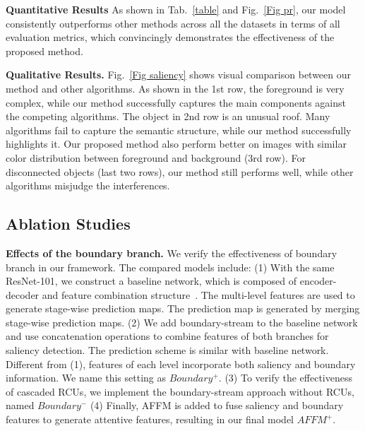 \documentclass[journal]{IEEEtran}
\begin{document}
\textbf{Quantitative Results}
As shown in Tab.~\ref{table} and Fig.~\ref{Fig pr}, our model consistently outperforms other methods across all the datasets in terms of all evaluation metrics, which convincingly demonstrates the effectiveness of the proposed method.

\textbf{Qualitative Results.}
Fig.~\ref{Fig saliency} shows visual comparison between our method and other algorithms.
As shown in the 1st row, the foreground is very complex, while our method successfully captures the main components against the competing algorithms.
The object in 2nd row is an unusual roof. Many algorithms fail to capture the semantic structure, while our method successfully highlights it. Our proposed method also perform better on images with similar color distribution between foreground and background (3rd row). For disconnected objects (last two rows), our method still performs well, while other algorithms misjudge the interferences.
\vspace{-2mm}
\subsection{Ablation Studies}{\bf{Effects of the boundary branch.}} We verify the effectiveness of boundary branch in our framework.
The compared models include:
(1) With the same ResNet-101, we construct a baseline network, which is composed of encoder-decoder and feature combination structure~\cite{Zhang2017Amulet}.
The multi-level features are used to generate stage-wise prediction maps. The prediction map is generated by merging stage-wise prediction maps.
(2) We add boundary-stream to the baseline network and use concatenation operations to combine features of both branches for saliency detection.
The prediction scheme is similar with baseline network.
Different from (1), features of each level incorporate both saliency and boundary information. We name this setting as $Boundary^{+}$.
(3) To verify the effectiveness of cascaded RCUs, we implement the boundary-stream approach without RCUs, named $Boundary^{-}$
(4) Finally, AFFM is added to fuse saliency and boundary features to generate attentive features, resulting in our final model $AFFM^{+}$.
\end{document}
